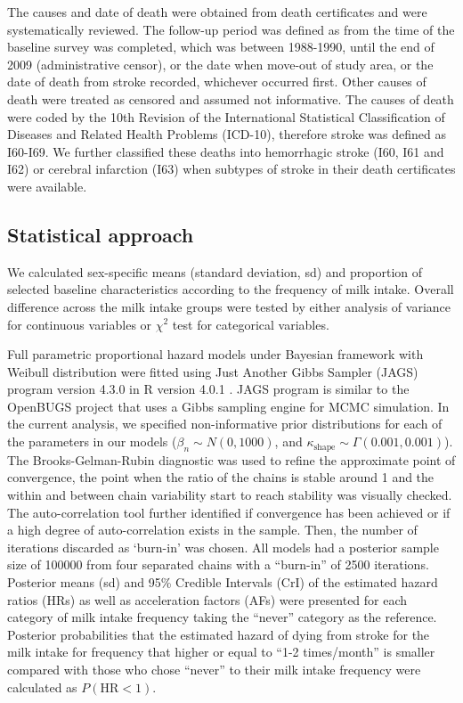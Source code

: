 \documentclass[nutrients,article,submitted,moreauthors,pdftex]{mdpi}
\begin{document}
The causes and date of death were obtained from death certificates and
were systematically reviewed. The follow-up period was defined as from
the time of the baseline survey was completed, which was between
1988-1990, until the end of 2009 (administrative censor), or the date
when move-out of study area, or the date of death from stroke recorded,
whichever occurred first. Other causes of death were treated as censored
and assumed not informative. The causes of death were coded by the 10th
Revision of the International Statistical Classification of Diseases and
Related Health Problems (ICD-10), therefore stroke was defined as
I60-I69. We further classified these deaths into hemorrhagic stroke
(I60, I61 and I62) or cerebral infarction (I63) when subtypes of stroke
in their death certificates were available.

\hypertarget{statistical-approach}{%
\subsection{Statistical approach}\label{statistical-approach}}

We calculated sex-specific means (standard deviation, sd) and proportion
of selected baseline characteristics according to the frequency of milk
intake. Overall difference across the milk intake groups were tested by
either analysis of variance for continuous variables or \(\chi^2\) test
for categorical variables.

Full parametric proportional hazard models under Bayesian framework with
Weibull distribution were fitted using Just Another Gibbs Sampler (JAGS)
program \citep{Plummer2003} version 4.3.0 in R version 4.0.1
\citep{RCT2020}. JAGS program is similar to the OpenBUGS
\citep{Lunn2009} project that uses a Gibbs sampling engine for MCMC
simulation. In the current analysis, we specified non-informative prior
distributions for each of the parameters in our models
(\(\beta_n \sim N(0, 1000)\), and
\(\kappa_{\text{shape}} \sim \Gamma(0.001, 0.001)\)). The
Brooks-Gelman-Rubin diagnostic \citep{Brooks1998} was used to refine the
approximate point of convergence, the point when the ratio of the chains
is stable around 1 and the within and between chain variability start to
reach stability was visually checked. The auto-correlation tool further
identified if convergence has been achieved or if a high degree of
auto-correlation exists in the sample. Then, the number of iterations
discarded as `burn-in' was chosen. All models had a posterior sample
size of 100000 from four separated chains with a ``burn-in'' of 2500
iterations. Posterior means (sd) and 95\% Credible Intervals (CrI) of
the estimated hazard ratios (HRs) as well as acceleration factors (AFs)
were presented for each category of milk intake frequency taking the
``never'' category as the reference. Posterior probabilities that the
estimated hazard of dying from stroke for the milk intake for frequency
that higher or equal to ``1-2 times/month'' is smaller compared with
those who chose ``never'' to their milk intake frequency were calculated
as \(P(\text{HR} < 1)\).
\end{document}
